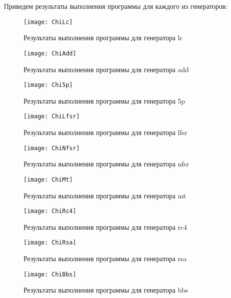 \documentclass[bachelor, och, coursework]{shiza}
\begin{document}
	Приведем результаты выполнения программы для каждого из генераторов:
	
	\begin{figure}[H]
		\centering
		\texttt{[image: ChiLc]}
		\caption{Результаты выполнения программы для генератора lc}
		\label{fig:ChiLc}
	\end{figure}
	
	\begin{figure}[H]
		\centering
		\texttt{[image: ChiAdd]}
		\caption{Результаты выполнения программы для генератора add}
		\label{fig:ChiAdd}
	\end{figure}
	
	\begin{figure}[H]
		\centering
		\texttt{[image: Chi5p]}
		\caption{Результаты выполнения программы для генератора 5p}
		\label{fig:Chi5p}
	\end{figure}	
	
	\begin{figure}[H]
		\centering
		\texttt{[image: ChiLfsr]}
		\caption{Результаты выполнения программы для генератора lfsr}
		\label{fig:ChiLfsr}
	\end{figure}
	
	\begin{figure}[H]
		\centering
		\texttt{[image: ChiNfsr]}
		\caption{Результаты выполнения программы для генератора nfsr}
		\label{fig:ChiNfsr}
	\end{figure}
	
	\begin{figure}[H]
		\centering
		\texttt{[image: ChiMt]}
		\caption{Результаты выполнения программы для генератора mt}
		\label{fig:ChiMt}
	\end{figure}		
	
	\begin{figure}[H]
		\centering
		\texttt{[image: ChiRc4]}
		\caption{Результаты выполнения программы для генератора rc4}
		\label{fig:ChiRc4}
	\end{figure}
	
	\begin{figure}[H]
		\centering
		\texttt{[image: ChiRsa]}
		\caption{Результаты выполнения программы для генератора rsa}
		\label{fig:ChiRsa}
	\end{figure}
	
	\begin{figure}[H]
		\centering
		\texttt{[image: ChiBbs]}
		\caption{Результаты выполнения программы для генератора bbs}
		\label{fig:ChiBbs}
	\end{figure}
	
\end{document}
